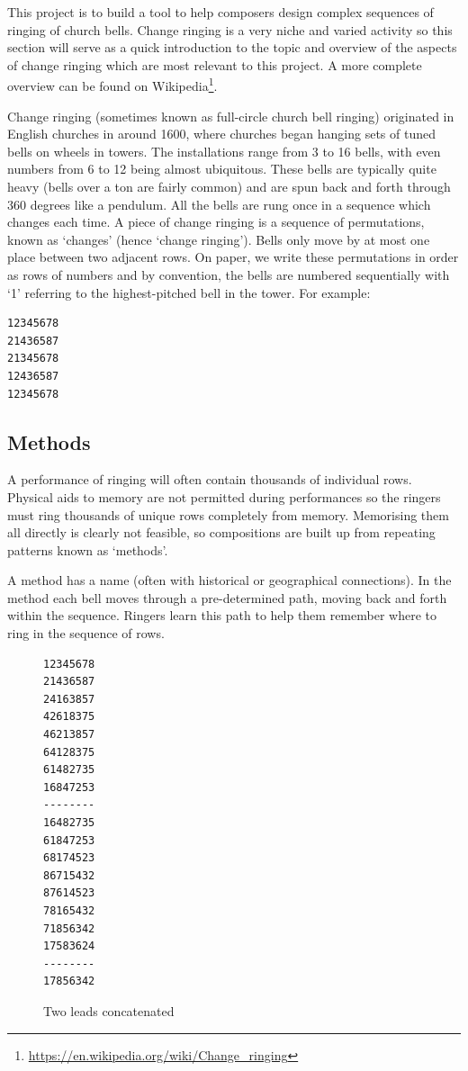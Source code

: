 \documentclass[12pt]{article}
\newcommand{\br}[0]{\vspace{10pt} \noindent}
\newcommand{\footurl}[1]{\footnote{\url{#1}}}
\begin{document}
This project is to build a tool to help composers design complex sequences of ringing of church
bells.  Change ringing is a very niche and varied activity so this section will serve as a quick
introduction to the topic and overview of the aspects of change ringing which are most relevant to
this project.  A more complete overview can be found
on Wikipedia\footurl{https://en.wikipedia.org/wiki/Change_ringing}.

\br{}Change ringing (sometimes known as full-circle church bell ringing) originated in English
churches in around 1600, where churches began hanging sets of tuned bells on wheels in towers.
The installations range from 3 to 16 bells, with even numbers from 6 to 12 being almost ubiquitous.
These bells are typically quite heavy (bells over a ton are fairly common) and are spun
back and forth through 360 degrees like a pendulum.  All the bells are rung once in a sequence which
changes each time.  A piece of change ringing is a sequence of permutations, known as `changes'
(hence `change ringing').  Bells only move by at most one place between two adjacent rows.  On
paper, we write these permutations in order as rows of numbers and by convention, the bells
are numbered sequentially with `1' referring to the highest-pitched bell in the tower.  For
example:

\begin{verbatim}
12345678
21436587
21345678
12436587
12345678
\end{verbatim}

\subsection{Methods}
A performance of ringing will often contain thousands of individual rows.  Physical aids to memory
are not permitted during performances so the ringers must ring thousands of unique rows completely
from memory.  Memorising them all directly is clearly not feasible, so compositions are built up
from repeating patterns known as `methods'.

A method has a name (often with historical or geographical connections). In the method each bell
moves through a pre-determined path, moving back and forth within the sequence. Ringers learn this
path to help them remember where to ring in the sequence of rows.

\begin{figure}
\centering
\begin{BVerbatim}
12345678
21436587
24163857
42618375
46213857
64128375
61482735
16847253
--------
16482735
61847253
68174523
86715432
87614523
78165432
71856342
17583624
--------
17856342
\end{BVerbatim}
\caption{Two leads concatenated}\label{fig:two-leads-lb8}
\end{figure}
\end{document}

